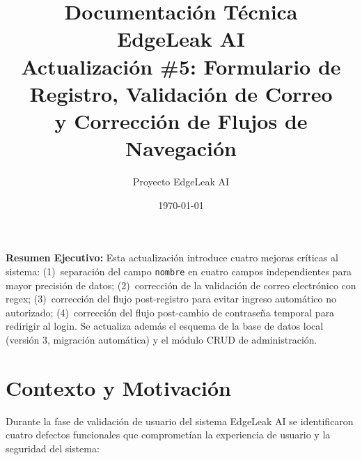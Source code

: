 \documentclass[12pt,a4paper]{article}
\title{
  \Huge\textbf{Documentación Técnica}\\[0.5em]
  \Large\textcolor{primaryblue}{EdgeLeak AI}\\[0.3em]
  \large Actualización \#5: Formulario de Registro, Validación de Correo\\
  y Corrección de Flujos de Navegación
}
\author{Proyecto EdgeLeak AI}
\date{\today}
\begin{document}
\maketitle
\thispagestyle{fancy}

\begin{mdframed}[linecolor=primaryblue,linewidth=1.5pt]
\textbf{Resumen Ejecutivo:} Esta actualización introduce cuatro mejoras críticas al sistema:
(1)~separación del campo \texttt{nombre} en cuatro campos independientes para mayor
precisión de datos; (2)~corrección de la validación de correo electrónico con regex;
(3)~corrección del flujo post-registro para evitar ingreso automático no autorizado;
(4)~corrección del flujo post-cambio de contraseña temporal para redirigir al login.
Se actualiza además el esquema de la base de datos local (versión 3, migración automática)
y el módulo CRUD de administración.
\end{mdframed}

\vspace{1em}
\tableofcontents
\newpage

\section{Contexto y Motivación}

Durante la fase de validación de usuario del sistema EdgeLeak AI se identificaron cuatro
defectos funcionales que comprometían la experiencia de usuario y la seguridad del sistema:
\end{document}
